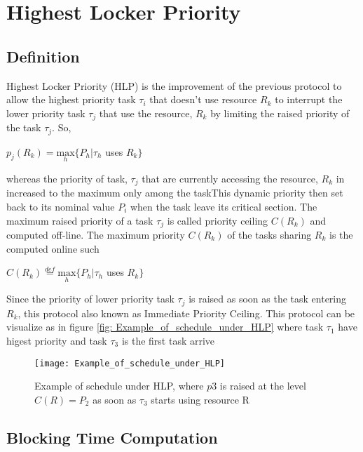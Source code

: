 \section{Highest Locker Priority}

\subsection{Definition}

Highest Locker Priority (HLP) is the improvement of the previous protocol to allow the highest priority task $\tau_{i}$ that doesn't use resource $R_{k}$ to interrupt the lower priority task $\tau_{j}$ that use the resource, $R_{k}$ by limiting the raised priority of the task $\tau_{j}$. So, 
 
\begin{center}
 $p_{j}(R_{k})=\underset{h}{\mathrm{max}} \{P_{h}| \tau_{h}$ uses $R_{k}\}  $ \cite{b5}
\end{center}

whereas the priority of task, $\tau_{j}$ that are currently accessing the resource, $R_{k}$ in increased to the maximum only among the taskThis dynamic priority then set back to its nominal value $P_{i}$ when the task leave its critical section. The maximum raised priority of a task $\tau_{j}$ is called priority ceiling $ C(R_{k}) $ and computed off-line.  The maximum priority $ C(R_{k}) $ of the tasks sharing $ R_{k} $ is the computed online such

\begin{center}
$C(R_{k})\stackrel{def}{=}\underset{h}{\mathrm{max}} \{P_{h}| \tau_{h}$ uses $R_{k}\}  $ \cite{b5}
\end{center}

Since the priority of lower priority task $\tau_{j}$ is raised as soon as the task entering $ R_{k} $, this protocol also known as Immediate Priority Ceiling. This protocol can be visualize as in figure \ref{fig: Example_of_schedule_under_HLP} where task $ \tau_{1} $ have higest priority and task $ \tau_{3} $ is the first task arrive

\begin{figure}[h]
    \centering
    \texttt{[image: Example\_of\_schedule\_under\_HLP]}
    \caption{ Example of schedule under HLP, where $ p3 $ is raised at the level $ C(R) = P_{2} $ as soon as $ \tau_{3} $ starts using resource R \cite{b5}}
    \label{fig:Example_of_schedule_under_HLP}
\end{figure}

 
\subsection{Blocking Time Computation}

